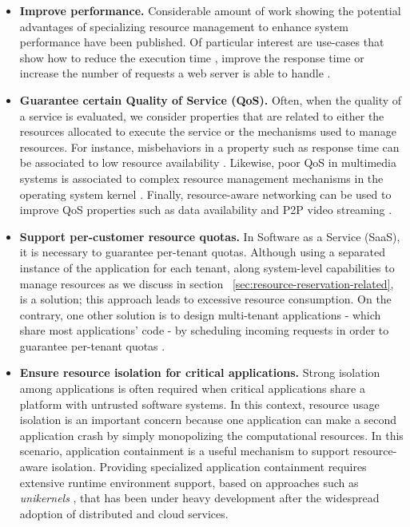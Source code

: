\begin{itemize}
\item \textbf{Improve performance.}
Considerable amount of work showing the potential advantages of specializing resource management to enhance system performance have been published.
Of particular interest are use-cases that show how to reduce the execution time \cite{Polo:2011:RAS:2414338.2414352}, improve the response time \cite{no se} or increase the number of requests a web server is able to handle \cite{engler1995exokernel,Belay:2014:IPD:2685048.2685053}.

\item \textbf{Guarantee certain Quality of Service (QoS).} 
Often, when the quality of a service is evaluated, we consider properties that are related to either the resources allocated to execute the service or the mechanisms used to manage resources.
For instance, misbehaviors in a property such as response time can be associated to low resource availability \cite{uno aquji,Chechik-2009}.
Likewise, poor QoS in multimedia systems is associated to complex resource management mechanisms in the operating system kernel \cite{Black1997}.
Finally, resource-aware networking can be used to improve QoS properties such as data availability \cite{Boldrini:2008:CRA:1549824.1550106} and P2P video streaming \cite{Pianese:2007:RLA:1326320.1326323,Alhaisoni:2010:RTO:1664767.1664770}.

\item \textbf{Support per-customer resource quotas.}
In Software as a Service (SaaS), it is necessary to guarantee per-tenant quotas.
Although using a separated instance of the application for each tenant, along system-level capabilities to manage resources as we discuss in section ~\ref{sec:resource-reservation-related}, is a solution; this approach leads to excessive resource consumption.
On the contrary, one other solution is to design multi-tenant applications - which share most applications' code - by scheduling incoming requests in order to guarantee per-tenant quotas \cite{KrSpAhKo2014_CCGrid_ResourceIsolation,KrWeKo2013-icwe-MTBenchmark}.    

\item \textbf{Ensure resource isolation for critical applications.}
Strong isolation among applications is often required when critical applications \cite{Knight:2002:SCS:581339.581406} share a platform with untrusted software systems.
In this context, resource usage isolation is an important concern because one application can make a second application crash by simply monopolizing the computational resources.
In this scenario, application containment \cite{Kamp00jails:confining,Soltesz:2007:COS:1272998.1273025,Madhavapeddy:2015:JJS:2789770.2789809} is a useful mechanism to support resource-aware isolation.
Providing specialized application containment requires extensive runtime environment support, based on approaches such as \textit{unikernels} \cite{Madhavapeddy:2013:ULO:2499368.2451167,Kivity:2014:OVO:2643634.2643642}, that has been under heavy development after the widespread adoption of distributed and cloud services.  

\end{itemize}

